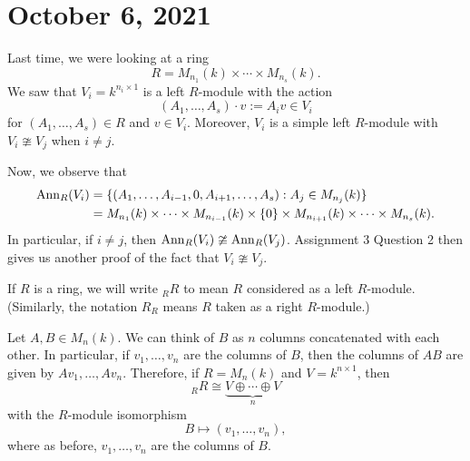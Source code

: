 \section{October 6, 2021}
Last time, we were looking at a ring 
\[ R = M_{n_1}(k) \times \cdots \times M_{n_s}(k). \] 
We saw that $V_i = k^{n_i \times 1}$ is a left $R$-module with the action 
\[ (A_1, \dots, A_s) \cdot v := A_i v \in V_i \] 
for $(A_1, \dots, A_s) \in R$ and $v \in V_i$. Moreover, $V_i$ is a 
simple left $R$-module with $V_i \ncong V_j$ when $i \neq j$. 

Now, we observe that 
\begin{align*} 
    \operatorname{Ann}_R(V_i) &= \{(A_1, \dots, A_{i-1}, 0, A_{i+1}, \dots, A_s) : 
    A_j \in M_{n_j}(k)\} \\
    &= M_{n_1}(k) \times \cdots \times M_{n_{i-1}}(k) \times \{0\} 
    \times M_{n_{i+1}}(k) \times \cdots \times M_{n_s}(k). 
\end{align*} 
In particular, if $i \neq j$, then $\operatorname{Ann}_R(V_i) \ncong \operatorname{Ann}_R(V_j)$. 
Assignment 3 Question 2 then gives us another proof of the fact that 
$V_i \ncong V_j$. 

\begin{notation} 
    If $R$ is a ring, we will write ${}_R R$ to mean $R$ considered as a left 
    $R$-module. (Similarly, the notation $R_R$ means $R$ taken as a right 
    $R$-module.)
\end{notation}

Let $A, B \in M_n(k)$. We can think of $B$ as $n$ columns concatenated 
with each other. In particular, if $v_1, \dots, v_n$ are the columns of $B$, 
then the columns of $AB$ are given by $Av_1, \dots, Av_n$. 
Therefore, if $R = M_n(k)$ and $V = k^{n \times 1}$, then 
\[ {}_R R \cong \underbrace{V \oplus \cdots \oplus V}_{n} \] 
with the $R$-module isomorphism 
\[ B \mapsto (v_1, \dots, v_n), \] 
where as before, $v_1, \dots, v_n$ are the columns of $B$. 

